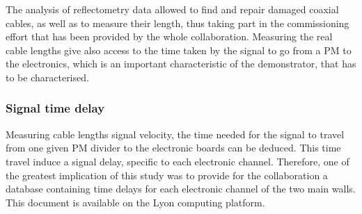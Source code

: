 The analysis of reflectometry data allowed to find and repair damaged coaxial cables, as well as to measure their length, thus taking part in the commissioning effort that has been provided by the whole collaboration.
Measuring the real cable lengths give also access to the time taken by the signal to go from a PM to the electronics, which is an important characteristic of the demonstrator, that has to be characterised.

\subsubsection*{Signal time delay}

Measuring cable lengths signal velocity, the time needed for the signal to travel from one given PM divider to the electronic boards can be deduced.
This time travel induce a signal delay, specific to each electronic channel.
Therefore, one of the greatest implication of this study was to provide for the collaboration a database containing time delays for each electronic channel of the two main walls.
This document is available on the Lyon computing platform.


